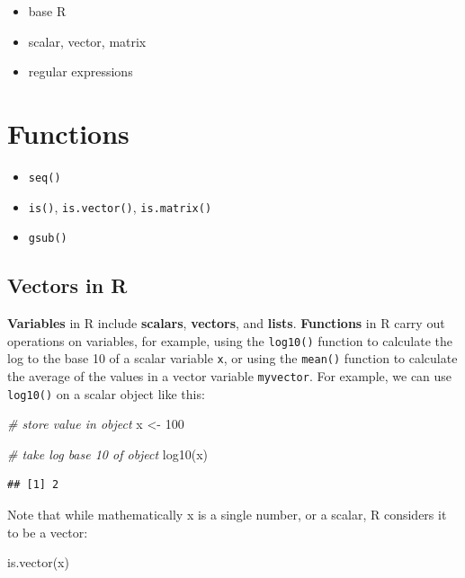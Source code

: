 \documentclass[
]{book}
\newenvironment{Shaded}{\begin{snugshade}}{\end{snugshade}}
\newcommand{\CommentTok}[1]{\textcolor[rgb]{0.56,0.35,0.01}{\textit{#1}}}
\newcommand{\DecValTok}[1]{\textcolor[rgb]{0.00,0.00,0.81}{#1}}
\newcommand{\FunctionTok}[1]{\textcolor[rgb]{0.00,0.00,0.00}{#1}}
\newcommand{\NormalTok}[1]{#1}
\newcommand{\OtherTok}[1]{\textcolor[rgb]{0.56,0.35,0.01}{#1}}
\providecommand{\tightlist}{%
  \setlength{\itemsep}{0pt}\setlength{\parskip}{0pt}}
\begin{document}
\begin{itemize}
\tightlist
\item
  base R
\item
  scalar, vector, matrix
\item
  regular expressions
\end{itemize}

\hypertarget{functions-2}{%
\chapter{Functions}\label{functions-2}}

\begin{itemize}
\tightlist
\item
  \texttt{seq()}
\item
  \texttt{is()}, \texttt{is.vector()}, \texttt{is.matrix()}
\item
  \texttt{gsub()}
\end{itemize}

\hypertarget{vectors-in-r}{%
\section{Vectors in R}\label{vectors-in-r}}

\textbf{Variables} in R include \textbf{scalars}, \textbf{vectors}, and \textbf{lists}. \textbf{Functions} in R carry out operations on variables, for example, using the \texttt{log10()} function to calculate the log to the base 10 of a scalar variable \texttt{x}, or using the \texttt{mean()} function to calculate the average of the values in a vector variable \texttt{myvector}. For example, we can use \texttt{log10()} on a scalar object like this:

\begin{Shaded}
\begin{Highlighting}[]
\CommentTok{\# store value in object}
\NormalTok{x }\OtherTok{\textless{}{-}} \DecValTok{100}

\CommentTok{\# take log base 10 of object}
\FunctionTok{log10}\NormalTok{(x)}
\end{Highlighting}
\end{Shaded}

\begin{verbatim}
## [1] 2
\end{verbatim}

Note that while mathematically x is a single number, or a scalar, R considers it to be a vector:

\begin{Shaded}
\begin{Highlighting}[]
\FunctionTok{is.vector}\NormalTok{(x)}
\end{Highlighting}
\end{Shaded}
\end{document}

